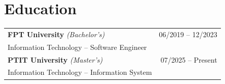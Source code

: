 \documentclass[a4paper,10pt]{article}
\begin{document}
\section{Education}

\begin{tabularx}{\linewidth}{@{}X r@{}}
    \textbf{\color{darktext}FPT University} \textit{(Bachelor's)} & \textcolor{lighttext}{\small 06/2019 -- 12/2023} \\
    \textcolor{primary}{Information Technology} -- Software Engineer & \\[0.8em]
    \textbf{\color{darktext}PTIT University} \textit{(Master's)} & \textcolor{lighttext}{\small 07/2025 -- Present} \\
    \textcolor{primary}{Information Technology} -- Information System & \\
\end{tabularx}
\end{document}
